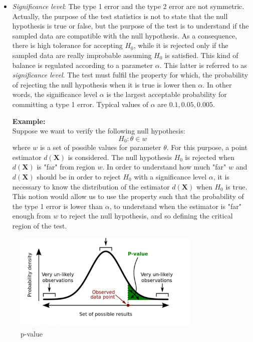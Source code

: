 \begin{itemize}
	\item \textit{Significance level}: The type 1 error and the type 2 error are not
		symmetric. Actually, the purpose of the test statistics is not to state that
		the null hypothesis is true or false, but the purpose of the test is to
		understand if the sampled data are compatible with the null hypothesis. As a
		consequence, there is high tolerance for accepting $H_{0}$, while it is rejected
		only if the sampled data are really improbable assuming $H_{0}$ is satisfied.
		This kind of balance is regulated according to a parameter $\alpha$. This latter
		is referred to as \textit{significance level}. The test must fulfil the property
		for which, the probability of rejecting the null hypothesis when it is true
		is lower then $\alpha$. In other words, the significance level $\alpha$ is
		the largest acceptable probability for committing a type 1 error. Typical values
		of $\alpha$ are $0.1, 0.05, 0.005$.
		\newline

		\textbf{Example:}\\ Suppose we want to verify the following null hypothesis:
		\[
			H_{0}: \theta \in w
		\]
		where $w$ is a set of possible values for parameter $\theta$. For this purpose,
		a point estimator $d(\pmb{X})$ is considered. The null hypothesis $H_{0}$ is
		rejected when $d(\pmb{X})$ is "far" from region $w$. In order to understand
		how much "far" $w$ and $d(\pmb{X})$ should be in order to reject $H_{0}$
		with a significance level $\alpha$, it is necessary to know the distribution
		of the estimator $d(\pmb{X})$ when $H_{0}$ is true. This notion would allow
		us to use the property such that the probability of the type 1 error is
		lower than $\alpha$, to understand when the estimator is "far" enough from $w$
		to reject the null hypothesis, and so defining the critical region of the
		test.
\end{itemize}

\begin{figure}[H]
	\centering
	\includegraphics[width=0.8\textwidth]{
        images/06_Evaluation_pValue.jpg
    }
	\caption{p-value}
	\label{fig:p_value}
\end{figure}


